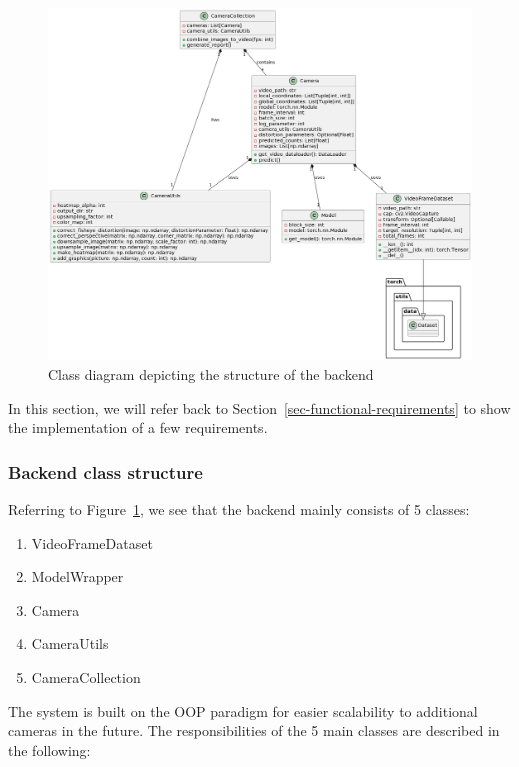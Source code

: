 \documentclass[
]{article}
\providecommand{\tightlist}{%
  \setlength{\itemsep}{0pt}\setlength{\parskip}{0pt}}\usepackage{longtable,booktabs,array}
\begin{document}
\begin{figure}

{\centering \includegraphics{../images/class-backend.png}

}

\caption{\label{fig-class-backend}Class diagram depicting the structure
of the backend}

\end{figure}

In this section, we will refer back to
Section~\ref{sec-functional-requirements} to show the implementation of
a few requirements.

\hypertarget{sec-classes}{%
\subsubsection{Backend class structure}\label{sec-classes}}

Referring to Figure~\ref{fig-class-backend}, we see that the backend
mainly consists of 5 classes:

\begin{enumerate}
\def\labelenumi{\arabic{enumi}.}
\tightlist
\item
  VideoFrameDataset
\item
  ModelWrapper
\item
  Camera
\item
  CameraUtils
\item
  CameraCollection
\end{enumerate}

The system is built on the OOP paradigm for easier scalability to
additional cameras in the future. The responsibilities of the 5 main
classes are described in the following:
\end{document}
